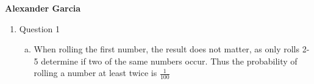 \documentclass[11pt]{article}
\begin{document}
\textbf{Alexander Garcia}
	\begin{enumerate}

		\item Question 1

			\begin{enumerate}[(a)]

				\item When rolling the first number, the result does not matter, as only
					rolls 2-5 determine if two of the same numbers occur. Thus the
					probability of rolling a number at least twice is $\frac{1}{100}$

			\end{enumerate}

	\end{enumerate}
\end{document}
